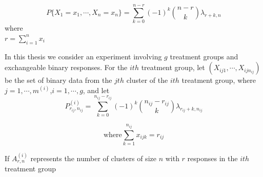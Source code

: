 \documentclass[12pt,oneside]{report}
\theoremstyle{definition}
\theoremstyle{mystyle}
\begin{document}

\begin{equation*}
P\{X_1=x_1,\cdots,X_n=x_n\}=\sum\limits_{k=0}^{n-r}(-1)^k\binom{n-r}{k}\lambda_{r+k,n}
\end{equation*}
where\\
$r=\sum\limits_{i=1}^{n}x_{i}$  


In this thesis we consider an experiment involving $g$ treatment groups and exchangeable binary responses.
For the $ith$ treatment group, let $(X_{ij1},\cdots,X_{ijn_{ij}})$ be the set of binary data from the $jth$ cluster of the
$ith$ treatment group, where $j=1,\cdots,m^{(i)}$,$i=1,\cdots,g$, and let\\

\begin{equation*}
P_{r_{ij},n_{ij}}^{(i)}
=\sum\limits_{k=0}^{n_{ij}-r_{ij}}(-1)^k
\binom{n_{ij}-r_{ij}}{k}\lambda_{r_{ij}+k,n_{ij}}
\end{equation*} %

\begin{equation*}
\text{where}  \sum\limits_{k=1}^{n_{ij}}x_{ijk}=r_{ij}
\end{equation*}

If  $A_{r,n}^{(i)}$  represents the number of clusters of size $n$ with $r$ responses in the $ith$ treatment group
 
\end{document}
